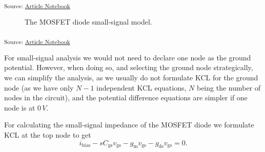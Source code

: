 \documentclass[
  a4paper,
  DIV=11,
  numbers=noendperiod]{scrartcl}
\begin{document}
\textsubscript{Source:
\href{https://iic-jku.github.io/analog-circuit-design/index.qmd.html}{Article
Notebook}}

\begin{figure}[H]


\caption{\label{fig-mosfet-diode-small-signal}The MOSFET diode
small-signal model.}

\end{figure}%

\textsubscript{Source:
\href{https://iic-jku.github.io/analog-circuit-design/index.qmd.html}{Article
Notebook}}

\begin{tcolorbox}[enhanced jigsaw, titlerule=0mm, left=2mm, coltitle=black, toprule=.15mm, breakable, opacitybacktitle=0.6, colframe=quarto-callout-note-color-frame, bottomtitle=1mm, toptitle=1mm, opacityback=0, colbacktitle=quarto-callout-note-color!10!white, title=\textcolor{quarto-callout-note-color}{\faInfo}\hspace{0.5em}{Ground Node Selection}, arc=.35mm, rightrule=.15mm, colback=white, bottomrule=.15mm, leftrule=.75mm]

For small-signal analysis we would not need to declare one node as the
ground potential. However, when doing so, and selecting the ground node
strategically, we can simplify the analysis, as we usually do not
formulate KCL for the ground node (as we have only \(N-1\) independent
KCL equations, \(N\) being the number of nodes in the circuit), and the
potential difference equations are simpler if one node is at \(0\,V\).

\end{tcolorbox}

For calculating the small-signal impedance of the MOSFET diode we
formulate KCL at the top node to get \[
i_\mathrm{bias} - s C_\mathrm{gs}v_\mathrm{gs}- g_\mathrm{m}v_\mathrm{gs}- g_\mathrm{ds}v_\mathrm{gs}= 0.
\]
\end{document}

